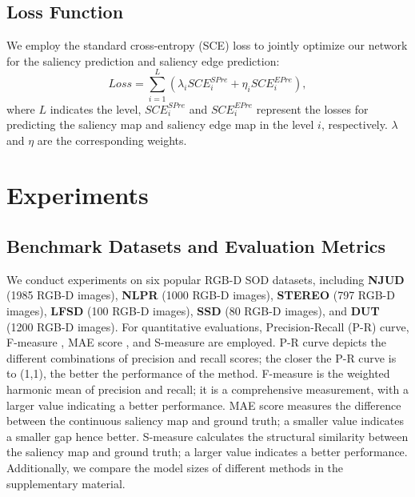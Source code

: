 \documentclass[runningheads]{llncs}
\begin{document}
\subsection{Loss Function}
We employ the standard cross-entropy (SCE) loss \cite{cross-entropy} to  jointly optimize our network for the saliency prediction and saliency edge prediction:
\begin{equation}
\label{equ_13}
Loss=\sum_{i=1}^{L} (\lambda_{i}SCE_{i}^{SPre}+\eta_{i}SCE_{i}^{EPre}),
\end{equation}
where $L$ indicates the level, $SCE_{i}^{SPre}$ and $SCE_{i}^{EPre}$ represent the losses for predicting the saliency map and saliency edge map in the level $i$, respectively. $\lambda$ and $\eta$ are the corresponding weights.




\section{Experiments}\label{er}
\subsection{Benchmark Datasets and Evaluation Metrics}

We conduct experiments on six popular RGB-D SOD datasets, including \textbf{NJUD} \cite{ACSD} (1985 RGB-D images), \textbf{NLPR} \cite{Peng2014} (1000 RGB-D images), \textbf{STEREO} \cite{Niu2012} (797 RGB-D images), \textbf{LFSD} \cite{LFSD} (100 RGB-D images), \textbf{SSD} \cite{SSD} (80 RGB-D images), and \textbf{DUT} \cite{DMRA} (1200 RGB-D images).
For quantitative evaluations, Precision-Recall (P-R) curve,  F-measure \cite{Fmeasure}, MAE score \cite{RERVIEW}, and S-measure \cite{S-measure} are employed. P-R curve depicts the different combinations of precision and recall scores; the closer the P-R curve is to (1,1), the better the performance of the method. F-measure is the weighted harmonic mean of precision and recall; it is a comprehensive measurement, with a larger value indicating a better performance. MAE score measures the difference between the continuous saliency map and ground truth; a smaller value indicates a smaller gap hence better. S-measure  calculates the structural similarity between the saliency map and ground truth; a larger value indicates a better performance. Additionally, we compare the model sizes of different methods in the supplementary material.
\end{document}
